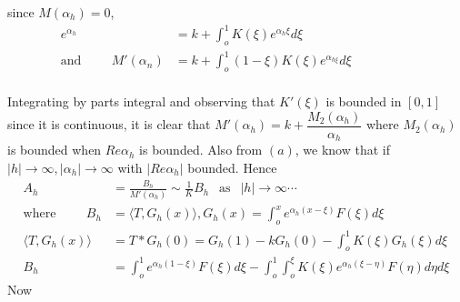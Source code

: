 since $M (\alpha_h) = 0$,
\begin{align*} 
  e^{\alpha_h} & = k + \int^1_o K (\xi) e^{\alpha_h \xi} d \xi
  \tag{6}\label{part2:chap1:sec2:eq6}\\  
  \text{and} \hspace{1cm} M' (\alpha_n) & = k + \int^1_o (1 - \xi) K
  (\xi)e^{\alpha_{h \xi}} d \xi\hspace{2cm}\\ 
\end{align*}

Integrating by parts integral and observing that $K'(\xi)$ is bounded in
$[0, 1]$ since it is continuous, it is clear that $M' (\alpha_h) = k +
\dfrac{M_2 (\alpha_h)}{\alpha_h}$ where $M_2 (\alpha_h)$ is bounded
when $Re \alpha_h$ is bounded. Also from $(a)$, we know that if $|h|
\to \infty, |\alpha_h| \to \infty$ with $|Re \alpha_h|$ bounded. Hence 
\begin{align*} 
  A_h & = \frac{B_h}{M' (\alpha_h)} \sim \frac{1}{K} B_h ~~\text { as }
  ~~|h| \to \infty \cdots \tag{7}\label{part2:chap1:sec2:eq7}\\ 
  \text{where}\hspace{1cm} B_h & = \langle  T, G_h (x) \rangle, G_h
  (x) = \int^x_o e^{\alpha_h (x - \xi)} F(\xi) d \xi\\
  \langle T, G_h (x) \rangle & = T \ast G_h (0) = G_h (1) - kG_h (0) -
  \int^1_o K(\xi) G_h (\xi) d \xi\\
  B_h & = \int^1_o e^{\alpha_h (1 - \xi)} F(\xi) d \xi - \int^1_o
  \int^\xi_o K(\xi) e^{\alpha_h (\xi - \eta)} F (\eta) d \eta  d\xi
\end{align*}
Now\pageoriginale  
